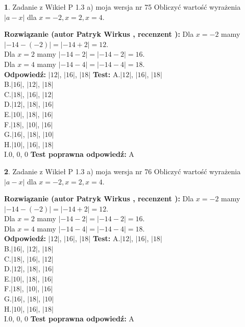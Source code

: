 \documentclass[12pt, a4paper]{article}
\theoremstyle{definition} %
\newtheorem{zad}{}
\newcommand{\zadStart}[1]{\begin{zad}#1\newline}
\newcommand{\zadStop}{\end{zad}}
\newcommand{\rozwStart}[2]{\noindent \textbf{Rozwiązanie (autor #1 , recenzent #2): }\newline}
\newcommand{\rozwStop}{\newline}
\newcommand{\odpStart}{\noindent \textbf{Odpowiedź:}\newline}
\newcommand{\odpStop}{\newline}
\newcommand{\testStart}{\noindent \textbf{Test:}\newline}
\newcommand{\testStop}{\newline}
\newcommand{\kluczStart}{\noindent \textbf{Test poprawna odpowiedź:}\newline}
\newcommand{\kluczStop}{\newline}
\begin{document}
\zadStart{Zadanie z Wikieł P 1.3 a) moja wersja nr 75}
Obliczyć wartość wyrażenia $|a - x|$ dla $x=-2,x=2,x=4$.
\zadStop
\rozwStart{Patryk Wirkus}{}
Dla $x = -2$ mamy $|-14 - (-2)| = |-14 + 2| = 12$.\\
Dla $x = 2$ mamy $|-14 - 2| = |-14 - 2| = 16$.\\
Dla $x = 4$ mamy $|-14 - 4| = |-14 - 4| = 18$.\\
\rozwStop
\odpStart
$|12|$, $|16|$, $|18|$
\odpStop
\testStart
A.$|12|$, $|16|$, $|18|$\\
B.$|16|$, $|12|$, $|18|$\\
C.$|18|$, $|16|$, $|12|$\\
D.$|12|$, $|18|$, $|16|$\\
E.$|10|$, $|18|$, $|16|$\\
F.$|18|$, $|10|$, $|16|$\\
G.$|16|$, $|18|$, $|10|$\\
H.$|10|$, $|16|$, $|18|$\\
I.$0$, $0$, $0$
\testStop
\kluczStart
A
\kluczStop



\zadStart{Zadanie z Wikieł P 1.3 a) moja wersja nr 76}
Obliczyć wartość wyrażenia $|a - x|$ dla $x=-2,x=2,x=4$.
\zadStop
\rozwStart{Patryk Wirkus}{}
Dla $x = -2$ mamy $|-14 - (-2)| = |-14 + 2| = 12$.\\
Dla $x = 2$ mamy $|-14 - 2| = |-14 - 2| = 16$.\\
Dla $x = 4$ mamy $|-14 - 4| = |-14 - 4| = 18$.\\
\rozwStop
\odpStart
$|12|$, $|16|$, $|18|$
\odpStop
\testStart
A.$|12|$, $|16|$, $|18|$\\
B.$|16|$, $|12|$, $|18|$\\
C.$|18|$, $|16|$, $|12|$\\
D.$|12|$, $|18|$, $|16|$\\
E.$|10|$, $|18|$, $|16|$\\
F.$|18|$, $|10|$, $|16|$\\
G.$|16|$, $|18|$, $|10|$\\
H.$|10|$, $|16|$, $|18|$\\
I.$0$, $0$, $0$
\testStop
\kluczStart
A
\kluczStop
\end{document}
